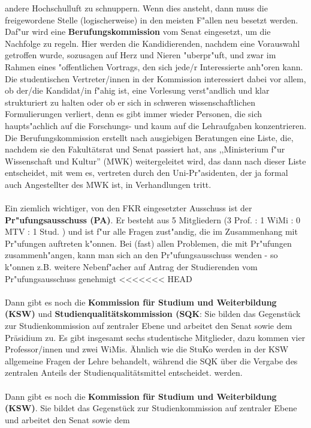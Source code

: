 andere Hochschulluft zu schnuppern. Wenn dies ansteht, dann muss die 
freigewordene Stelle (logischerweise) in den meisten F"allen neu besetzt 
werden. Daf"ur wird eine \textbf{Berufungskommission} vom Senat eingesetzt, um 
die Nachfolge zu regeln. Hier werden die Kandidierenden, nachdem eine Vorauswahl 
getroffen wurde, sozusagen auf Herz und Nieren "uberpr"uft, und zwar im Rahmen 
eines "offentlichen Vortrags, den sich jede/r Interessierte anh"oren kann. Die 
 studentischen Vertreter/innen in der Kommission interessiert dabei vor allem, ob 
der/die Kandidat/in f"ahig ist, eine Vorlesung verst"andlich und klar 
strukturiert zu halten oder ob er sich in schweren wissenschaftlichen 
Formulierungen verliert, denn es gibt immer wieder Personen, die sich
haupts"achlich auf die Forschungs- und kaum auf die Lehraufgaben konzentrieren.
Die Berufungskommission 
erstellt nach ausgiebigen Beratungen eine Liste, die, nachdem sie den Fakultätsrat und Senat 
passiert hat, ans ,,Ministerium f"ur 
Wissenschaft und Kultur'' (MWK) weitergeleitet wird, das dann nach dieser 
Liste entscheidet, mit wem es, vertreten durch den Uni-Pr"asidenten, der ja 
formal auch Angestellter des MWK ist, in Verhandlungen tritt.
\\
\\
Ein ziemlich wichtiger, von den FKR eingesetzter Ausschuss ist der 
\textbf{Pr"ufungsausschuss (PA)}. Er besteht aus 5 Mitgliedern (3 Prof. : 1 WiMi : 0 MTV : 
1 Stud. ) und ist f"ur alle Fragen zust"andig, die im Zusammenhang mit Pr"ufungen
auftreten k"onnen. Bei (fast) allen Problemen, die mit Pr"ufungen 
zusammenh"angen, kann
man sich an den Pr"ufungsausschuss wenden - so k"onnen z.B. weitere
Nebenf"acher auf Antrag der Studierenden vom Pr"ufungsausschuss genehmigt
<<<<<<< HEAD
\\\\
Dann gibt es noch die \textbf{Kommission für Studium und Weiterbildung (KSW)} und \textbf{Studienqualitätskommission (SQK}:
Sie bilden das Gegenstück zur Studienkommission auf zentraler Ebene und arbeitet den Senat sowie dem 
Präsidium zu. Es gibt insgesamt sechs studentische Mitglieder, dazu kommen vier Professor/innen und zwei WiMis. 
Ähnlich wie die StuKo werden in der KSW  allgemeine Fragen der Lehre behandelt, während die SQK über die Vergabe des zentralen Anteils der Studienqualitätsmittel entscheidet.
werden.
\\
\\
Dann gibt es noch die \textbf{Kommission für Studium und Weiterbildung (KSW)}. 
Sie bildet das Gegenstück zur Studienkommission auf zentraler Ebene und arbeitet den Senat sowie dem 
